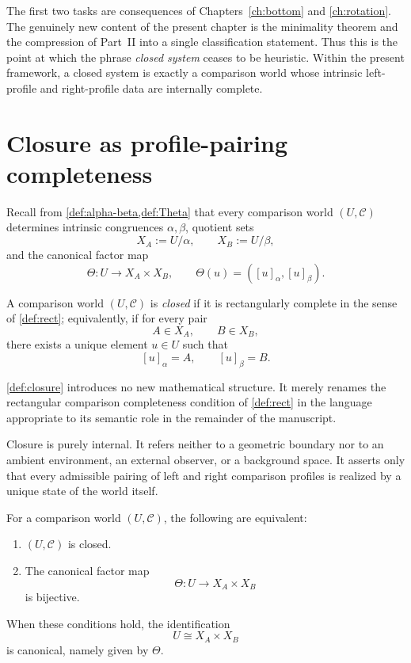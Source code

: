 The first two tasks are consequences of Chapters~\ref{ch:bottom} and
\ref{ch:rotation}. The genuinely new content of the present chapter is
the minimality theorem and the compression of Part~II into a single
classification statement.
Thus this is the point at which the phrase \emph{closed system} ceases
to be heuristic. Within the present framework, a closed system is
exactly a comparison world whose intrinsic left-profile and right-profile
data are internally complete.
\section{Closure as profile-pairing completeness}
\label{sec:closure-profile}
Recall from \cref{def:alpha-beta,def:Theta} that every comparison world
\((U,\mathcal C)\) determines intrinsic congruences \(\alpha,\beta\),
quotient sets
\[
	X_A:=U/\alpha,
	\qquad
	X_B:=U/\beta,
\]
and the canonical factor map
\[
	\Theta:U\to X_A\times X_B,
	\qquad
	\Theta(u)=([u]_\alpha,[u]_\beta).
\]
\begin{definition}[Closure]
	\label{def:closure}
	A comparison world \((U,\mathcal C)\) is \emph{closed} if it is
	rectangularly complete in the sense of \cref{def:rect}; equivalently, if
	for every pair
	\[
		A\in X_A,
		\qquad
		B\in X_B,
	\]
	there exists a unique element \(u\in U\) such that
	\[
		[u]_\alpha=A,
		\qquad
		[u]_\beta=B.
	\]
\end{definition}
\begin{remark}
	\cref{def:closure} introduces no new mathematical structure. It merely
	renames the rectangular comparison completeness condition of
	\cref{def:rect} in the language appropriate to its semantic role in the
	remainder of the manuscript.
\end{remark}
\begin{remark}
	Closure is purely internal. It refers neither to a geometric boundary
	nor to an ambient environment, an external observer, or a background
	space. It asserts only that every admissible pairing of left and right
	comparison profiles is realized by a unique state of the world itself.
\end{remark}
\begin{proposition}
	\label{prop:closure-bijective}
	For a comparison world \((U,\mathcal C)\), the following are equivalent:
	\begin{enumerate}[label=\textup{(\roman*)}]
		\item \((U,\mathcal C)\) is closed.
		\item The canonical factor map
		      \[
			      \Theta:U\to X_A\times X_B
		      \]
		      is bijective.
	\end{enumerate}
	When these conditions hold, the identification
	\[
		U\cong X_A\times X_B
	\]
	is canonical, namely given by \(\Theta\).
\end{proposition}
